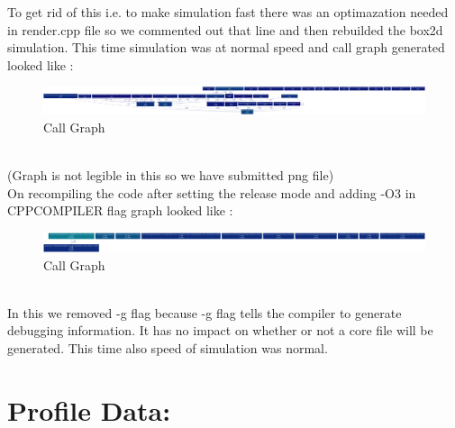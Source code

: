 \documentclass[12pt,a4paper]{article}
\begin{document}
To get rid of this i.e. to make simulation fast there was an optimazation needed in render.cpp file so we commented out that line and then rebuilded the box2d simulation.
This time simulation was at normal speed  and call graph generated looked like :
\begin{figure}[ht!]
\centering
\includegraphics[scale=0.08]{./debugVersion_after.png}
\caption{Call Graph}
\end{figure} 
\\(Graph is not legible in this so we have submitted png file)
\\
On recompiling the code after setting the release mode and adding -O3 in CPPCOMPILER flag graph looked like :
\begin{figure}[ht!]
\centering
\includegraphics[scale=0.2]{./releaseVersion.png}
\caption{Call Graph}
\end{figure} 
\\	
In this we removed -g flag because -g flag tells the compiler to generate debugging information. It has no impact on whether or not a core file will be generated.
This time also speed of simulation was normal.
\pagebreak
\section*{Profile Data:}
\end{document}
